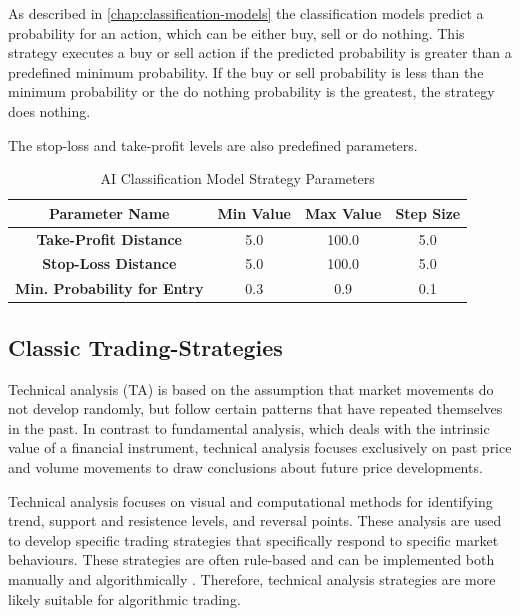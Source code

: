As described in \autoref{chap:classification-models} the classification models predict a probability for an action, which can be either buy, sell or do nothing.
This strategy executes a buy or sell action if the predicted probability is greater than a predefined minimum probability.
If the buy or sell probability is less than the minimum probability or the do nothing probability is the greatest, the strategy does nothing.

The stop-loss and take-profit levels are also predefined parameters.

\begin{table}[H]
    \centering
    \begin{tabular}{cccc}
        \toprule
        Parameter Name & Min Value & Max Value & Step Size
        \\
        \midrule
        \textbf{Take-Profit Distance}       & 5.0 & 100.0 & 5.0 \\
        \textbf{Stop-Loss Distance}         & 5.0 & 100.0 & 5.0 \\
        \textbf{Min. Probability for Entry} & 0.3 & 0.9   & 0.1 \\
        \bottomrule
    \end{tabular}
    \caption{AI Classification Model Strategy Parameters}
    \label{tbl:classification-strategy-parameters}
\end{table}

\subsection{Classic Trading-Strategies}

Technical analysis (TA) is based on the assumption that market movements do not develop randomly, but follow certain patterns that have repeated themselves in the past.
In contrast to fundamental analysis, which deals with the intrinsic value of a financial instrument, technical analysis focuses exclusively on past price and volume movements to draw conclusions about future price developments.

Technical analysis focuses on visual and computational methods for identifying trend, support and resistence levels, and reversal points.
These analysis are used to develop specific trading strategies that specifically respond to specific market behaviours.
These strategies are often rule-based and can be implemented both manually and algorithmically \cite{ta-basics}.
Therefore, technical analysis strategies are more likely suitable for algorithmic trading.

